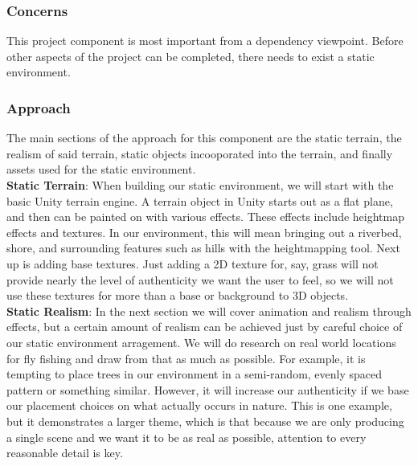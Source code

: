 \documentclass[10pt,journal,compsoc,onecolumn, draftclsnofoot]{IEEEtran}
\begin{document}
\subsubsection{Concerns}
This project component is most important from a dependency viewpoint.
Before other aspects of the project can be completed, there needs to exist a static environment.

\subsubsection{Approach}
The main sections of the approach for this component are the static terrain, the realism of said terrain, static objects incooporated into the terrain, and finally assets used for the static environment.\\

\hangindent=0.5cm \textbf{Static Terrain}: When building our static environment, we
will start with the basic Unity terrain engine. A terrain object in Unity starts out
as a flat plane, and then can be painted on with various
effects.\cite{unity_man_terrain} These effects include heightmap effects and
textures. In our environment, this will mean bringing out a riverbed, shore, and
surrounding features such as hills with the heightmapping tool. Next up is adding
base textures. Just adding a 2D texture for, say, grass will not provide nearly the
level of authenticity we want the user to feel, so we will not use these textures
for more than a base or background to 3D objects.\\

\hangindent=0.5cm \textbf{Static Realism}: In the next section we will cover
animation and realism through effects, but a certain amount of realism can be
achieved just by careful choice of our static environment arragement. We will do
research on real world locations for fly fishing and draw from that as much as
possible. For example, it is tempting to place trees in our environment in a
semi-random, evenly spaced pattern or something similar. However, it will increase
our authenticity if we base our placement choices on what actually occurs in nature.
This is one example, but it demonstrates a larger theme, which is that because we
are only producing a single scene and we want it to be as real as possible,
attention to every reasonable detail is key.\\
\end{document}

